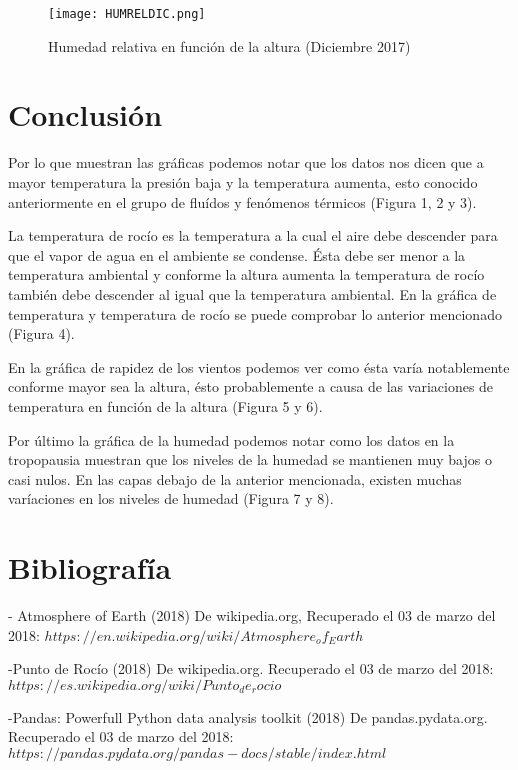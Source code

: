 \documentclass[12pt]{article}
\begin{document}
\begin{figure}
\begin{centering}
  \texttt{[image: HUMRELDIC.png]}
  \caption{Humedad relativa en función de la altura (Diciembre 2017)}
\end{centering}
\end{figure}


\section{Conclusión}

Por lo que muestran las gráficas podemos notar que los datos nos dicen que a mayor temperatura la presión baja y la temperatura aumenta, esto conocido anteriormente en el grupo de fluídos y fenómenos térmicos (Figura 1, 2 y 3).

La temperatura de rocío es la temperatura a la cual el aire debe descender para que el vapor de agua en el ambiente se condense. Ésta debe ser menor a la temperatura ambiental y conforme la altura aumenta la temperatura de rocío también debe descender al igual que la temperatura ambiental. En la gráfica de temperatura y temperatura de rocío se puede comprobar lo anterior mencionado (Figura 4).

En la gráfica de rapidez de los vientos podemos ver como ésta varía notablemente conforme mayor sea la altura, ésto probablemente a causa de las variaciones de temperatura en función de la altura (Figura 5 y 6).

Por último la gráfica de la humedad podemos notar como los datos en la tropopausia muestran que los niveles de la humedad se mantienen muy bajos o casi nulos. En las capas debajo de la anterior mencionada, existen muchas varíaciones en los niveles de humedad (Figura 7 y 8).

\section{Bibliografía}

- Atmosphere of Earth (2018) De wikipedia.org, Recuperado el 03 de marzo del 2018: $https://en.wikipedia.org/wiki/Atmosphere_of_Earth$

-Punto de Rocío (2018) De wikipedia.org. Recuperado el 03 de marzo del 2018: $https://es.wikipedia.org/wiki/Punto_de_rocio$

-Pandas: Powerfull Python data analysis toolkit (2018) De pandas.pydata.org. Recuperado el 03 de marzo del 2018: $https://pandas.pydata.org/pandas-docs/stable/index.html$
\end{document}
